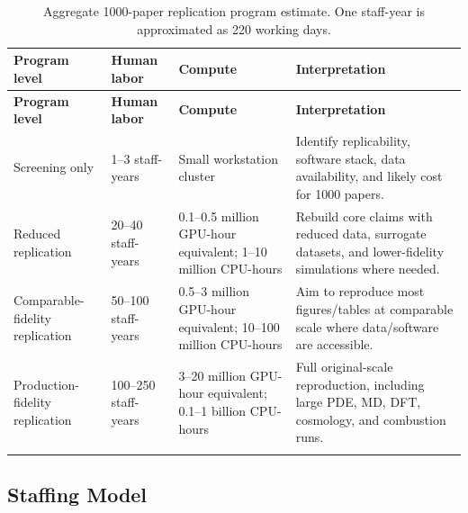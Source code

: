\documentclass[11pt,letterpaper]{article}
\begin{document}
\begin{longtable}{p{4.4cm}p{3.4cm}p{3.4cm}p{5.0cm}}
\toprule
\textbf{Program level} & \textbf{Human labor} & \textbf{Compute} & \textbf{Interpretation} \\
\midrule
\endfirsthead
\toprule
\textbf{Program level} & \textbf{Human labor} & \textbf{Compute} & \textbf{Interpretation} \\
\midrule
\endhead
Screening only & 1--3 staff-years & Small workstation cluster & Identify replicability, software stack, data availability, and likely cost for 1000 papers. \\
\addlinespace
Reduced replication & 20--40 staff-years & 0.1--0.5 million GPU-hour equivalent; 1--10 million CPU-hours & Rebuild core claims with reduced data, surrogate datasets, and lower-fidelity simulations where needed. \\
\addlinespace
Comparable-fidelity replication & 50--100 staff-years & 0.5--3 million GPU-hour equivalent; 10--100 million CPU-hours & Aim to reproduce most figures/tables at comparable scale where data/software are accessible. \\
\addlinespace
Production-fidelity replication & 100--250 staff-years & 3--20 million GPU-hour equivalent; 0.1--1 billion CPU-hours & Full original-scale reproduction, including large PDE, MD, DFT, cosmology, and combustion runs. \\
\bottomrule
\caption{Aggregate 1000-paper replication program estimate. One staff-year is approximated as 220 working days.}
\end{longtable}

\subsection{Staffing Model}
\end{document}
